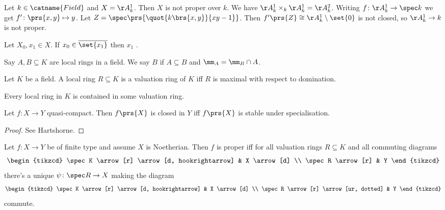 \documentclass[10pt,a4paper,twoside,openany,hidelinks]{book}
\begin{document}
\begin{example}
Let $k \in \catname{Field}$ and $X = \AA_k^1$. Then $X$ is not proper over $k$.
We have $\AA_k^1 \times_k \AA_k^1 = \AA_k^2$. Writing $f \colon \AA_k^1 \to \spec k$ we get $f' \colon \prs{x,y} \mapsto y$. Let $Z = \spec\prs{\quot{k\brs{x,y}}{xy-1}}$.
Then $f'\prs{Z} \cong \AA_k^1 \setminus \set{0}$ is not closed, so $\AA_k^1 \to k$ is not proper.
\end{example}

\begin{definition}[Specialisation]
Let $X_0, x_1 \in X$. If $x_0 \in \overline{\set{x_1}}$ then $x_1$ .
\end{definition}

\begin{definition}
Say $A,B \subseteq K$ are local rings in a field. We say $B$  if $A \subseteq B$ and $\mm_A = \mm_B \cap A$.
\end{definition}

\begin{theorem}[A-M Section 4]
Let $K$ be a field. A local ring $R \subseteq K$ is a valuation ring of $K$ iff $R$ is maximal with respect to domination.
\end{theorem}

\begin{corollary}
Every local ring in $K$ is contained in some valuation ring.
\end{corollary}

\begin{lemma} \label{lemma:valuative_for_properness}
Let $f \colon X \to Y$ quasi-compact. Then $f\prs{X}$ is closed in $Y$ iff $f\prs{X}$ is stable under specialisation.
\end{lemma}

\begin{proof}
See Hartshorne.
\end{proof}

\begin{theorem}
Let $f \colon X \to Y$ be of finite type and assume $X$ is Noetherian. Then $f$ is proper iff for all valuation rings $R \subseteq K$ and all commuting diagrams
$$
\begin{tikzcd}
\spec K \arrow[r] \arrow[d, hookrightarrow] & X \arrow[d] \\ \spec R \arrow[r] & Y
\end{tikzcd}
$$
there's a unique $\psi \colon \spec R \to X$ making the diagram
$$
\begin{tikzcd}
\spec K \arrow[r] \arrow[d, hookrightarrow] & X \arrow[d] \\ \spec R \arrow[r] \arrow[ur, dotted] & Y
\end{tikzcd}
$$
commute.
\end{theorem}
\end{document}
